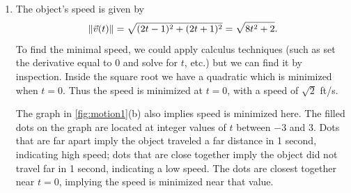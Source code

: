 \begin{example}
\begin{enumerate}
	We can think of acceleration as ``pulling'' the velocity vector in a certain direction. At $t=-1$, the velocity vector points down and to the left; at $t=1$, the velocity vector has been pulled in the $\bracket{2,2}$ direction and is now pointing up and to the right. In \autoref{fig:motion1}(b) we plot more velocity/acceleration vectors, making more clear the effect acceleration has on velocity.
	
	Since $\vat$ is constant in this example, as $t$ grows large \vvt\ becomes almost parallel to \vat. For instance, when $t=10$, $\vec v(10) =\bracket{19,21}$, which is nearly parallel to $\bracket{2,2}$.
	
	\item		The object's speed is given by 
	\[\left\lVert \vec v(t) \right\rVert = \sqrt{(2t-1)^2+(2t+1)^2} =\sqrt{8t^2+2}.\] To find the minimal speed, we could apply calculus techniques (such as set the derivative equal to 0 and solve for $t$, etc.) but we can find it by inspection. Inside the square root we have a quadratic which is minimized when $t=0$. Thus the speed is minimized at $t=0$, with a speed of $\sqrt{2}$ ft/s.
	
	The graph in \autoref{fig:motion1}(b) also implies speed is minimized here. The filled dots on the graph are located at integer values of $t$ between $-3$ and 3. Dots that are far apart imply the object traveled a far distance in 1 second, indicating high speed; dots that are close together imply the object did not travel far in 1 second, indicating a low speed. The dots are closest together near $t=0$, implying the speed is minimized near that value.
\end{enumerate}
\end{example}

